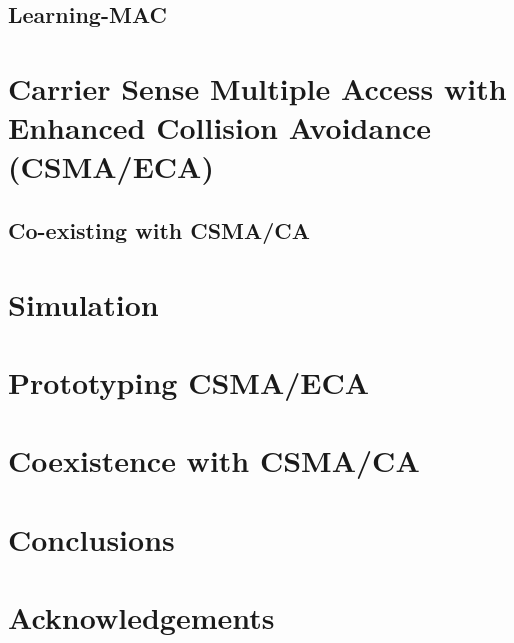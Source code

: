 \documentclass[a4paper,journal]{IEEEtran}
\begin{document}

\subsection{Learning-MAC}

\section{Carrier Sense Multiple Access with Enhanced Collision Avoidance (CSMA/ECA)}\label{introProtocol}
	\subsection{Co-existing with CSMA/CA}
\section{Simulation}\label{simulations}
\section{Prototyping CSMA/ECA}\label{prototype}
\section{Coexistence with CSMA/CA}\label{prototypeResults}
\section{Conclusions}\label{conclusions}
\section{Acknowledgements}




\end{document}
